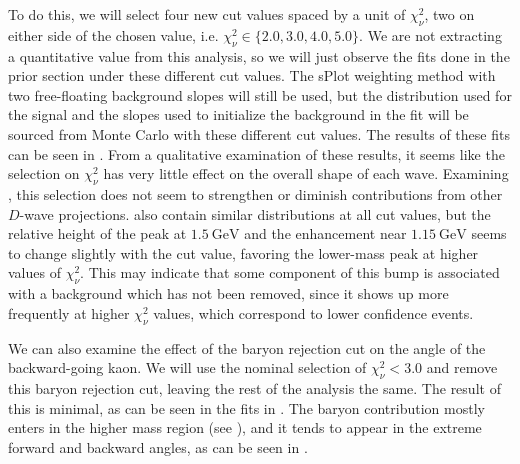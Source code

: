 To do this, we will select four new cut values spaced by a unit of $\chi^2_\nu$, two on either side of the chosen value, i.e. $\chi^2_\nu \in \{2.0, 3.0, 4.0, 5.0\}$. We are not extracting a quantitative value from this analysis, so we will just observe the fits done in the prior section under these different cut values. The sPlot weighting method with two free-floating background slopes will still be used, but the distribution used for the signal and the slopes used to initialize the background in the fit will be sourced from Monte Carlo with these different cut values. The results of these fits can be seen in . From a qualitative examination of these results, it seems like the selection on $\chi^2_\nu$ has very little effect on the overall shape of each wave. Examining , this selection does not seem to strengthen or diminish contributions from other $D$-wave projections.  also contain similar distributions at all cut values, but the relative height of the peak at $\SI{1.5}{\giga\electronvolt}$ and the enhancement near $\SI{1.15}{\giga\electronvolt}$ seems to change slightly with the cut value, favoring the lower-mass peak at higher values of $\chi^2_\nu$. This may indicate that some component of this bump is associated with a background which has not been removed, since it shows up more frequently at higher $\chi^2_\nu$ values, which correspond to lower confidence events.


We can also examine the effect of the baryon rejection cut on the angle of the backward-going kaon. We will use the nominal selection of $\chi^2_\nu < 3.0$ and remove this baryon rejection cut, leaving the rest of the analysis the same. The result of this is minimal, as can be seen in the fits in . The baryon contribution mostly enters in the higher mass region (see ), and it tends to appear in the extreme forward and backward angles, as can be seen in .

